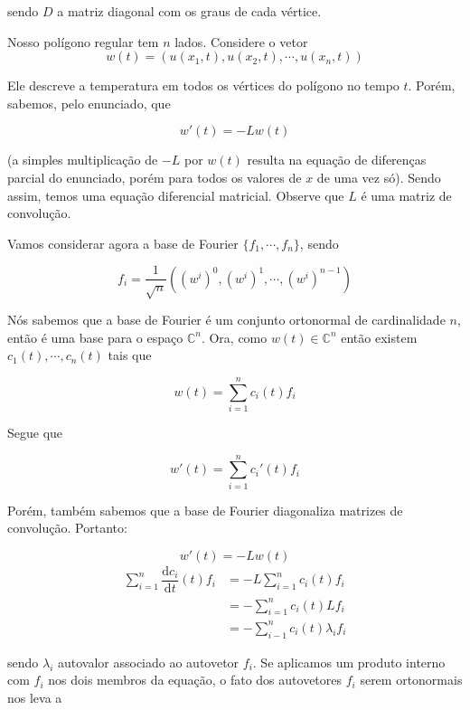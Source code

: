 \documentclass{article}
\begin{document}
\begin{enumerate}
                sendo $D$ a matriz diagonal com os graus de cada vértice.

                Nosso polígono regular tem $n$ lados. Considere o vetor $$w(t) = (u(x_1, t), u(x_2, t), \cdots, u(x_n, t))$$

                Ele descreve a temperatura em todos os vértices do polígono no tempo $t$.
                Porém, sabemos, pelo enunciado, que

                $$w'(t) = -L w(t)$$

                (a simples multiplicação de $-L$ por $w(t)$ resulta na equação de diferenças parcial do enunciado,
                porém para todos os valores de $x$ de uma vez só).
                Sendo assim, temos uma equação diferencial matricial.
                Observe que $L$ é uma matriz de convolução.
                
                Vamos considerar agora a base de Fourier $\{f_1, \cdots, f_n\}$, sendo

                $$f_i = \dfrac{1}{\sqrt{n}} \left((w^i)^0, (w^i)^1, \cdots, (w^i)^{n-1}\right)$$

                Nós sabemos que a base de Fourier é um conjunto ortonormal de cardinalidade $n$, então é uma base para o espaço
                $\mathbb{C}^n$. Ora, como $w(t) \in \mathbb{C}^n$ então existem $c_1(t), \cdots, c_n(t)$ tais que

                $$w(t) = \sum_{i=1}^n c_i(t)f_i$$

                Segue que

                $$w'(t) = \sum_{i=1}^n c_i'(t)f_i$$

                Porém, também sabemos que a base de Fourier diagonaliza matrizes de convolução. Portanto:

                $$w'(t) = -L w(t)$$
                \begin{align*}
                    \sum_{i=1}^n \dfrac{\mathrm{d}c_i}{\mathrm{d}t}(t)f_i &= -L\sum_{i=1}^nc_i(t)f_i \\
                    &= -\sum_{i=1}^nc_i(t)Lf_i \\
                    &= -\sum_{i-1}^n c_i(t)\lambda_if_i
                \end{align*}

                sendo $\lambda_i$ autovalor associado ao autovetor $f_i$.
                Se aplicamos um produto interno com $f_i$ nos dois membros da equação,
                o fato dos autovetores $f_i$ serem ortonormais nos leva a


\end{enumerate}
\end{document}

